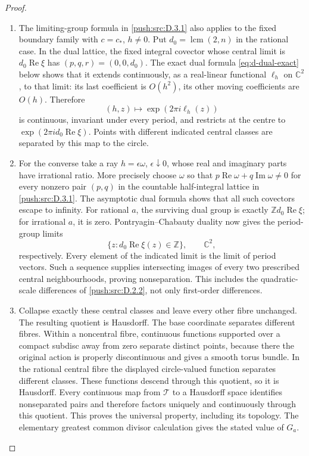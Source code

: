 \begin{proof}
\begin{enumerate}[label=\arabic*.,leftmargin=*]
\item The limiting-group formula in \ref{push:src:D.3.1} also
applies to the fixed boundary family with \(c=c_*\), \(h\ne0\).
Put \(d_0=\operatorname{lcm}(2,n)\) in the rational case. In the dual
lattice, the fixed integral covector whose central limit is
\(d_0\operatorname{Re}\xi\) has
\((p,q,r)=(0,0,d_0)\). The exact dual formula
\eqref{eq:d-dual-exact} below shows that it extends continuously, as a
real-linear functional \(\ell_h\) on \(\mathbb C^2\), to that limit:
its last coefficient is \(O(h^2)\), its other moving coefficients
are \(O(h)\). Therefore
\[
 (h,z)\longmapsto\exp(2\pi i\ell_h(z))
\]
is continuous, invariant under every period, and restricts at the
centre to \(\exp(2\pi i d_0\operatorname{Re}\xi)\).
Points with different indicated central classes are separated by this
map to the circle.

\item For the converse take a ray \(h=\epsilon\omega\),
\(\epsilon\downarrow0\), whose real and imaginary parts have
irrational ratio. More precisely choose \(\omega\) so that
\(p\operatorname{Re}\omega+q\operatorname{Im}\omega\ne0\)
for every nonzero pair \((p,q)\) in the countable half-integral
lattice in \ref{push:src:D.3.1}. The asymptotic dual formula shows that all such
covectors escape to infinity. For rational \(a\), the surviving dual
group is exactly \(\mathbb Z d_0\operatorname{Re}\xi\); for
irrational \(a\), it is zero. Pontryagin--Chabauty duality
\cite[Theorem~3.1, p.~2017; proof, p.~2018]{Cornulier2011} now gives the period-group limits
\[
 \{z:d_0\operatorname{Re}\xi(z)\in\mathbb Z\},\qquad
 \mathbb C^2,
\]
respectively. Every element of the indicated limit is the limit of
period vectors. Such a sequence supplies intersecting images
of every two prescribed central neighbourhoods, proving
nonseparation. This includes the quadratic-scale differences of
\ref{push:src:D.2.2}, not only first-order differences.

\item Collapse exactly these central classes and leave every other fibre
unchanged. The resulting quotient is Hausdorff. The base coordinate
separates different fibres. Within a noncentral fibre, continuous
functions supported over a compact subdisc away from zero separate
distinct points, because there the original action is properly
discontinuous and gives a smooth torus bundle. In the rational central
fibre the displayed circle-valued function separates different
classes. These functions descend through this quotient, so
it is Hausdorff. Every continuous map from \(\mathcal T\) to a
Hausdorff space identifies nonseparated pairs and therefore factors
uniquely and continuously through this quotient. This proves the
universal property, including its topology. The elementary greatest
common divisor calculation gives the stated value of \(G_a\).
\end{enumerate}
\end{proof}